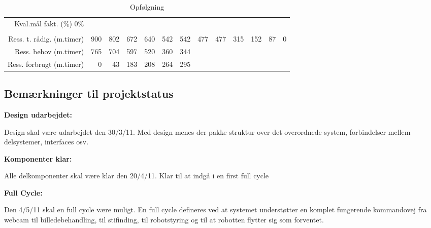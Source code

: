 \begin{sidewaystable}[!htbp]
\begin{scriptsize}
\begin{tabular}{r|rrrrrrrr|rrrr}
    Kval.mål fakt. (\%) 0\% &       &       &       &       &       &       &       &       &       &       &  \\
          &       &       &       &       &       &       &       &       &       &       &  \\
    Ress. t. rådig. (m.timer) & 900   & 802   & 672   & 640   & 542   & 542   & 477   & 477   & 315   & 152   & 87    & 0 \\
    Ress. behov (m.timer) & 765   & 704 & 597 & 520   & 360   & 344   &       &       &       &       &   \\
    Ress. forbrugt (m.timer) & 0     & 43    & 183   & 208   & 264   & 295   &       &       &       &       &  \\
    \end{tabular}%
\end{scriptsize}
\caption{Opfølgning}
\end{sidewaystable}


\subsection{Bemærkninger til projektstatus}
\textbf{Design udarbejdet:}

Design skal være udarbejdet den 30/3/11. 
Med design menes der pakke struktur over det overordnede system, forbindelser mellem delsystemer, interfaces osv.

\textbf{Komponenter klar:}

Alle delkomponenter skal være klar den 20/4/11. Klar til at indgå i en first full cycle	

\textbf{Full Cycle:}

Den 4/5/11 skal en full cycle være muligt.
En full cycle defineres ved at systemet understøtter en komplet fungerende kommandovej fra webcam til billedebehandling, til stifinding, til robotstyring og til at robotten flytter sig som forventet.